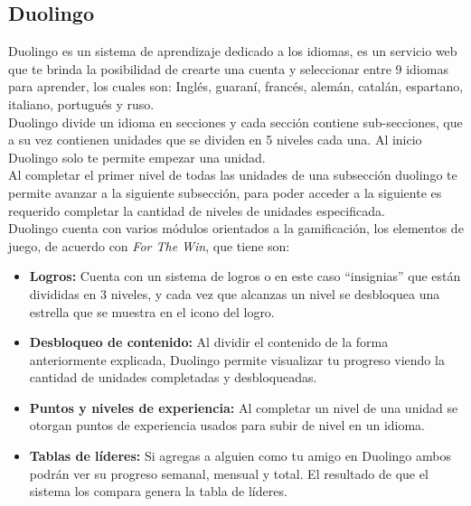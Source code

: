 \begin{multicols*}{2}
\subsection*{Duolingo}

 Duolingo es un sistema de aprendizaje dedicado a los idiomas, es un servicio web que
 te brinda la posibilidad de crearte una cuenta y seleccionar entre 9 idiomas para aprender,
 los cuales son: Inglés, guaraní, francés, alemán, catalán, espartano, italiano, portugués y ruso.\\

 \noindent Duolingo divide un idioma en secciones y cada sección contiene sub-secciones,
 que a su vez contienen unidades que se dividen en 5 niveles cada una. Al inicio Duolingo
 solo te permite empezar una unidad.\\

 \noindent Al completar el primer nivel de todas las unidades de una subsección duolingo
 te permite avanzar a la siguiente subsección, para poder acceder a la siguiente es requerido
 completar la cantidad de niveles de unidades especificada.\\

 \noindent Duolingo cuenta con varios módulos orientados a la gamificación, los elementos
 de juego, de acuerdo con {\em For The Win}, que tiene son:

    \begin{itemize}
    \item {\bf Logros:} Cuenta con un sistema de logros o en este caso ``insignias''
        que están divididas en 3 niveles, y cada vez que alcanzas un nivel se
        desbloquea una estrella que se muestra en el icono del logro.

    \item {\bf Desbloqueo de contenido:} Al dividir el contenido de la forma
        anteriormente explicada, Duolingo permite visualizar tu progreso viendo
        la cantidad de unidades completadas y desbloqueadas.

    \item {\bf Puntos y niveles de experiencia:} Al completar un nivel de una unidad
        se otorgan puntos de experiencia usados para subir de nivel en un idioma.

    \item {\bf Tablas de líderes:} Si agregas a alguien como tu amigo en Duolingo ambos
        podrán ver su progreso semanal, mensual y total. El resultado de que el sistema
         los compara genera la tabla de líderes.


\end{itemize}
\end{multicols*}
